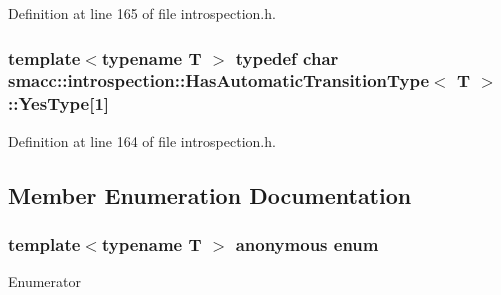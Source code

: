 Definition at line 165 of file introspection.\+h.

\subsubsection[{\texorpdfstring{Yes\+Type}{YesType}}]{\setlength{\rightskip}{0pt plus 5cm}template$<$typename T $>$ typedef char {\bf smacc\+::introspection\+::\+Has\+Automatic\+Transition\+Type}$<$ T $>$\+::Yes\+Type\mbox{[}1\mbox{]}\hspace{0.3cm}{\ttfamily [private]}}\hypertarget{classsmacc_1_1introspection_1_1HasAutomaticTransitionType_abeb599df547eb3db36684b6cb343eade}{}\label{classsmacc_1_1introspection_1_1HasAutomaticTransitionType_abeb599df547eb3db36684b6cb343eade}


Definition at line 164 of file introspection.\+h.



\subsection{Member Enumeration Documentation}
\subsubsection[{\texorpdfstring{anonymous enum}{anonymous enum}}]{\setlength{\rightskip}{0pt plus 5cm}template$<$typename T $>$ anonymous enum}\hypertarget{classsmacc_1_1introspection_1_1HasAutomaticTransitionType_ac663d77745eac0f2b2ceb29e4c8b300b}{}\label{classsmacc_1_1introspection_1_1HasAutomaticTransitionType_ac663d77745eac0f2b2ceb29e4c8b300b}
\begin{Desc}
\item[Enumerator]\par
\begin{description}
\item[{\em 
value\hypertarget{classsmacc_1_1introspection_1_1HasAutomaticTransitionType_ac663d77745eac0f2b2ceb29e4c8b300ba8aba42189dc17891761a49375684776d}{}\label{classsmacc_1_1introspection_1_1HasAutomaticTransitionType_ac663d77745eac0f2b2ceb29e4c8b300ba8aba42189dc17891761a49375684776d}
}]\end{description}
\end{Desc}


